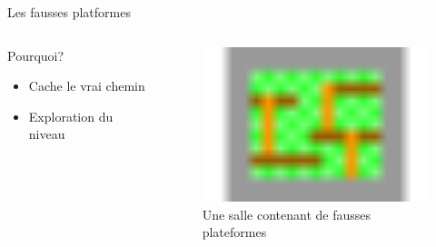 \documentclass{beamer}
\begin{document}
{\begin{frame}{Les fausses platformes}
    \begin{columns}
        \begin{block}{Pourquoi?}
            \begin{itemize}
                \item[\bullet] Cache le vrai chemin
                \item[\bullet] Exploration du niveau
            \end{itemize}
        \end{block}
        \begin{figure}
            \centering
            \includegraphics[width=1.0\textwidth]{images/fake_platforms}
            \caption{Une salle contenant de fausses plateformes}
        \end{figure}
    \end{columns}
\end{frame}

}
\end{document}
